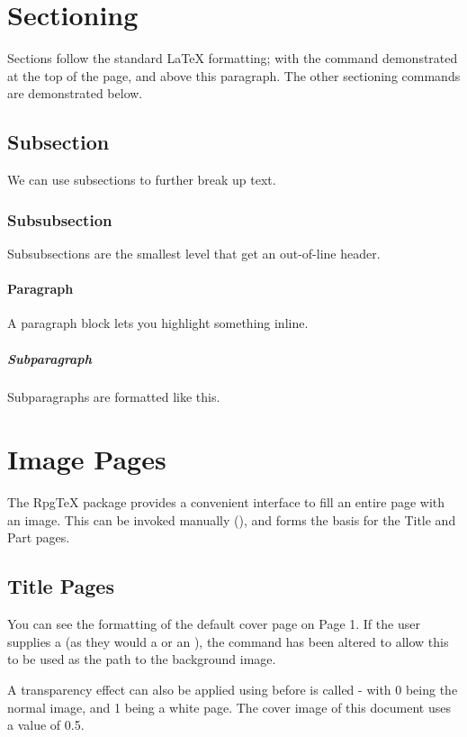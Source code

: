 	\section{Sectioning}
		Sections follow the standard \LaTeX{} formatting; with the  command demonstrated at the top of the page, and  above this paragraph. The other sectioning commands are demonstrated below.

		\subsection{Subsection}

			We can use subsections to further break up text.

			\subsubsection{Subsubsection}

				Subsubsections are the smallest level that get an out-of-line header.

				\paragraph{Paragraph} A paragraph block lets you highlight something inline.

				\subparagraph{Subparagraph} Subparagraphs are formatted like this.

	\section{Image Pages}
		The RpgTeX package provides a convenient interface to fill an entire page with an image. This can be invoked manually (), and forms the basis for the Title and Part pages.

		\subsection{Title Pages}
			You can see the formatting of the default cover page on Page 1. If the user supplies a  (as they would a  or an ), the  command has been altered to allow this to be used as the path to the background image.

			A transparency effect can also be applied using  before  is called - with 0 being the normal image, and 1 being a white page. The cover image of this document uses a value of 0.5.

